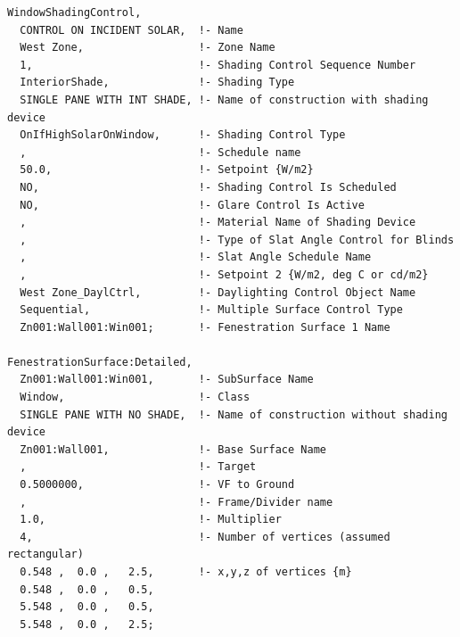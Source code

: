 \begin{lstlisting}
WindowShadingControl,
  CONTROL ON INCIDENT SOLAR,  !- Name
  West Zone,                  !- Zone Name
  1,                          !- Shading Control Sequence Number
  InteriorShade,              !- Shading Type
  SINGLE PANE WITH INT SHADE, !- Name of construction with shading device
  OnIfHighSolarOnWindow,      !- Shading Control Type
  ,                           !- Schedule name
  50.0,                       !- Setpoint {W/m2}
  NO,                         !- Shading Control Is Scheduled
  NO,                         !- Glare Control Is Active
  ,                           !- Material Name of Shading Device
  ,                           !- Type of Slat Angle Control for Blinds
  ,                           !- Slat Angle Schedule Name
  ,                           !- Setpoint 2 {W/m2, deg C or cd/m2}
  West Zone_DaylCtrl,         !- Daylighting Control Object Name
  Sequential,                 !- Multiple Surface Control Type
  Zn001:Wall001:Win001;       !- Fenestration Surface 1 Name

FenestrationSurface:Detailed,
  Zn001:Wall001:Win001,       !- SubSurface Name
  Window,                     !- Class
  SINGLE PANE WITH NO SHADE,  !- Name of construction without shading device
  Zn001:Wall001,              !- Base Surface Name
  ,                           !- Target
  0.5000000,                  !- VF to Ground
  ,                           !- Frame/Divider name
  1.0,                        !- Multiplier
  4,                          !- Number of vertices (assumed rectangular)
  0.548 ,  0.0 ,   2.5,       !- x,y,z of vertices {m}
  0.548 ,  0.0 ,   0.5,
  5.548 ,  0.0 ,   0.5,
  5.548 ,  0.0 ,   2.5;
\end{lstlisting}

